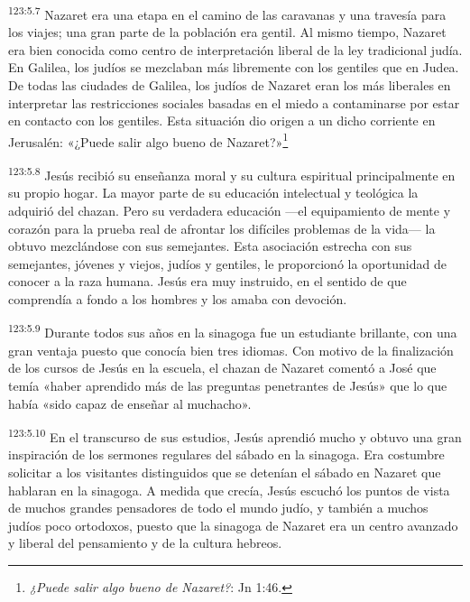 \par
\textsuperscript{123:5.7} Nazaret era una etapa en el camino de las caravanas y una travesía para los viajes; una gran parte de la población era gentil. Al mismo tiempo, Nazaret era bien conocida como centro de interpretación liberal de la ley tradicional judía. En Galilea, los judíos se mezclaban más libremente con los gentiles que en Judea. De todas las ciudades de Galilea, los judíos de Nazaret eran los más liberales en interpretar las restricciones sociales basadas en el miedo a contaminarse por estar en contacto con los gentiles. Esta situación dio origen a un dicho corriente en Jerusalén: «¿Puede salir algo bueno de Nazaret?»\footnote{\textit{¿Puede salir algo bueno de Nazaret?}: Jn 1:46.}

\par
\textsuperscript{123:5.8} Jesús recibió su enseñanza moral y su cultura espiritual principalmente en su propio hogar. La mayor parte de su educación intelectual y teológica la adquirió del chazan. Pero su verdadera educación ---el equipamiento de mente y corazón para la prueba real de afrontar los difíciles problemas de la vida--- la obtuvo mezclándose con sus semejantes. Esta asociación estrecha con sus semejantes, jóvenes y viejos, judíos y gentiles, le proporcionó la oportunidad de conocer a la raza humana. Jesús era muy instruido, en el sentido de que comprendía a fondo a los hombres y los amaba con devoción.

\par
\textsuperscript{123:5.9} Durante todos sus años en la sinagoga fue un estudiante brillante, con una gran ventaja puesto que conocía bien tres idiomas. Con motivo de la finalización de los cursos de Jesús en la escuela, el chazan de Nazaret comentó a José que temía «haber aprendido más de las preguntas penetrantes de Jesús» que lo que había «sido capaz de enseñar al muchacho».

\par
\textsuperscript{123:5.10} En el transcurso de sus estudios, Jesús aprendió mucho y obtuvo una gran inspiración de los sermones regulares del sábado en la sinagoga. Era costumbre solicitar a los visitantes distinguidos que se detenían el sábado en Nazaret que hablaran en la sinagoga. A medida que crecía, Jesús escuchó los puntos de vista de muchos grandes pensadores de todo el mundo judío, y también a muchos judíos poco ortodoxos, puesto que la sinagoga de Nazaret era un centro avanzado y liberal del pensamiento y de la cultura hebreos.

